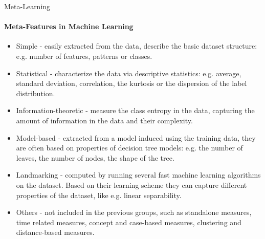 \begin{frame}[c]{Meta-Learning}
\framesubtitle{Meta-Features in Machine Learning}

\begin{itemize}
	\item \alert{Simple} - easily extracted from the data, describe the basic dataset structure: e.g. number of features, patterns or classes. \pause
	
	\item \alert{Statistical} - characterize the data via descriptive statistics: e.g. average, standard deviation, correlation, the kurtosis or the dispersion of the label distribution. \pause
	
	\item \alert{Information-theoretic} - measure the class entropy in the data, capturing the amount of information in the data and their complexity. \pause 
    
    \item \alert{Model-based} - extracted from a model induced using the training data, they are often based on properties of decision tree models: e.g. the number of leaves, the number of nodes, the shape of the tree. \pause
		
	\item \alert{Landmarking} - computed by running several fast machine learning algorithms on the dataset. Based on their learning scheme they can capture different properties of the dataset, like e.g. linear separability. \pause
	
	\item \alert{Others} - not included in the previous groups, such as standalone measures, time related measures, concept and case-based measures, clustering and distance-based measures.
	
\end{itemize}

\end{frame}
